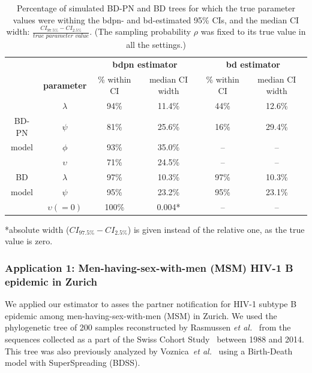 \documentclass[10pt,letterpaper]{article}
\begin{document}
 \begin{table}[!h]\centering
\small
\caption{Percentage of simulated BD-PN and BD trees for which the true parameter values were withing the bdpn- and bd-estimated 95\% CIs, and the median CI width: $\frac{CI_{97.5\%} - CI_{2.5\%}}{\textit{true parameter value}}$. (The sampling probability $\rho$ was fixed to its true value in all the settings.)  \smallskip}
\begin{tabular}{c|c|cc|cc}
& & \multicolumn{2}{c|}{\textbf{bdpn estimator}} &  \multicolumn{2}{c}{\textbf{bd estimator}} \\
& \textbf{parameter} & \multicolumn{1}{c|}{\% within CI} & median CI width & \multicolumn{1}{c|}{\% within CI} & median CI width \\
\toprule 
& $\lambda$ & 94\% & 11.4\%& 44\% & 12.6\%\\
BD-PN & $\psi$ & 81\% & 25.6\% & 16\% & 29.4\%\\
model &  $\phi$ & 93\% & 35.0\% & -- & --\\
& $\upsilon$ & 71\% & 24.5\% & -- & --\\
\midrule
BD & $\lambda$ & 97\% & 10.3\%& 97\% & 10.3\%\\
model & $\psi$ & 95\% & 23.2\% & 95\% & 23.1\%\\
& $\upsilon(=0)$ & 100\% & 0.004* & -- & --\\
\bottomrule
\end{tabular}
\begin{flushleft} *absolute width ($CI_{97.5\%} - CI_{2.5\%}$) is given instead of the relative one, as the true value is zero.
\end{flushleft}
\label{tbl:ci}
\end{table}

\subsubsection*{Application 1: Men-having-sex-with-men (MSM) HIV-1 B epidemic in Zurich}
We applied our estimator to asses the partner notification for HIV-1 subtype B epidemic among men-having-sex-with-men (MSM) in Zurich.  We used the phylogenetic tree of 200 samples reconstructed by Rasmussen \textit{et al.}~\cite{Rasmussen2017} from the sequences collected as a part of the Swiss Cohort Study~\cite{swisshivcohortstudyCohortProfileSwiss2010a} between 1988 and 2014. This tree was also previously analyzed by Voznica~\textit{et al.}~\cite{Voznica2021} using a Birth-Death model with SuperSpreading (BDSS). 
\end{document}
